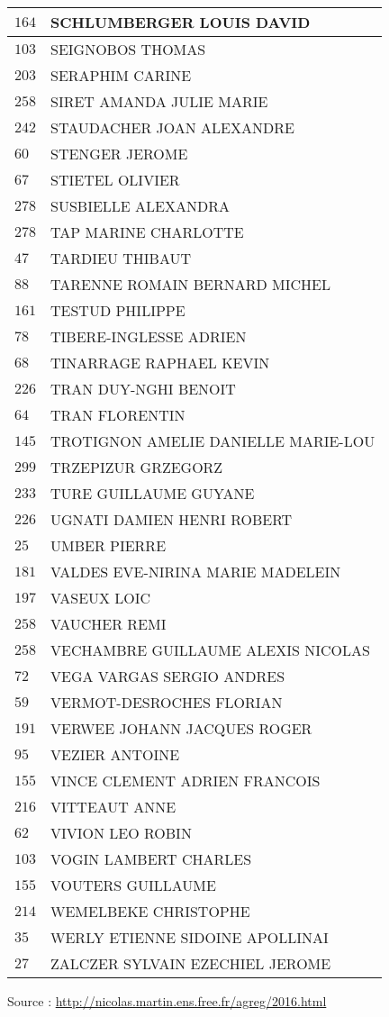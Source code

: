 \begin{xltabular}{\linewidth}{|l|X|}
    \hline
    $164$ & SCHLUMBERGER LOUIS DAVID \\
    \hline
    $103$ & SEIGNOBOS THOMAS \\
    \hline
    $203$ & SERAPHIM CARINE \\
    \hline
    $258$ & SIRET AMANDA JULIE MARIE \\
    \hline
    $242$ & STAUDACHER JOAN ALEXANDRE \\
    \hline
    $60$ & STENGER JEROME \\
    \hline
    $67$ & STIETEL OLIVIER \\
    \hline
    $278$ & SUSBIELLE ALEXANDRA \\
    \hline
    $278$ & TAP MARINE CHARLOTTE \\
    \hline
    $47$ & TARDIEU THIBAUT \\
    \hline
    $88$ & TARENNE ROMAIN BERNARD MICHEL \\
    \hline
    $161$ & TESTUD PHILIPPE \\
    \hline
    $78$ & TIBERE-INGLESSE ADRIEN \\
    \hline
    $68$ & TINARRAGE RAPHAEL KEVIN \\
    \hline
    $226$ & TRAN DUY-NGHI BENOIT \\
    \hline
    $64$ & TRAN FLORENTIN \\
    \hline
    $145$ & TROTIGNON AMELIE DANIELLE MARIE-LOU \\
    \hline
    $299$ & TRZEPIZUR GRZEGORZ \\
    \hline
    $233$ & TURE GUILLAUME GUYANE \\
    \hline
    $226$ & UGNATI DAMIEN HENRI ROBERT \\
    \hline
    $25$ & UMBER PIERRE \\
    \hline
    $181$ & VALDES EVE-NIRINA MARIE MADELEIN \\
    \hline
    $197$ & VASEUX LOIC \\
    \hline
    $258$ & VAUCHER REMI \\
    \hline
    $258$ & VECHAMBRE GUILLAUME ALEXIS NICOLAS \\
    \hline
    $72$ & VEGA VARGAS SERGIO ANDRES \\
    \hline
    $59$ & VERMOT-DESROCHES FLORIAN \\
    \hline
    $191$ & VERWEE JOHANN JACQUES ROGER \\
    \hline
    $95$ & VEZIER ANTOINE \\
    \hline
    $155$ & VINCE CLEMENT ADRIEN FRANCOIS \\
    \hline
    $216$ & VITTEAUT ANNE \\
    \hline
    $62$ & VIVION LEO ROBIN \\
    \hline
    $103$ & VOGIN LAMBERT CHARLES \\
    \hline
    $155$ & VOUTERS GUILLAUME \\
    \hline
    $214$ & WEMELBEKE CHRISTOPHE \\
    \hline
    $35$ & WERLY ETIENNE SIDOINE APOLLINAI \\
    \hline
    $27$ & ZALCZER SYLVAIN EZECHIEL JEROME \\
    \hline
  \end{xltabular}

  \begin{flushright}
    {\tiny Source : \url{http://nicolas.martin.ens.free.fr/agreg/2016.html}}
  \end{flushright}

